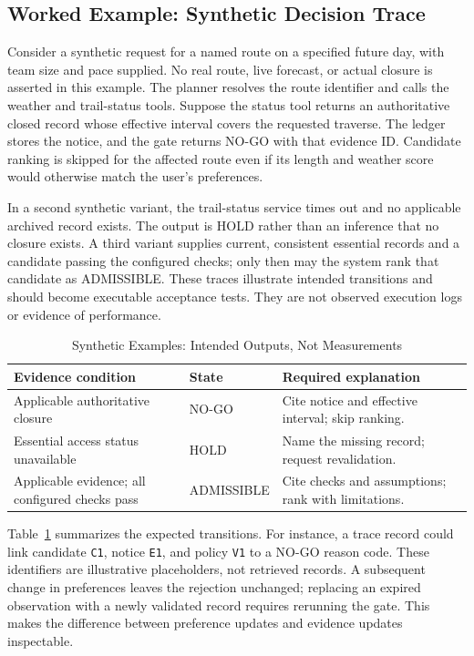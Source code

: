 \documentclass[conference]{IEEEtran}
\begin{document}
\subsection{Worked Example: Synthetic Decision Trace}
Consider a synthetic request for a named route on a specified future day, with team size and pace supplied. No real route, live forecast, or actual closure is asserted in this example. The planner resolves the route identifier and calls the weather and trail-status tools. Suppose the status tool returns an authoritative closed record whose effective interval covers the requested traverse. The ledger stores the notice, and the gate returns NO-GO with that evidence ID. Candidate ranking is skipped for the affected route even if its length and weather score would otherwise match the user's preferences.

In a second synthetic variant, the trail-status service times out and no applicable archived record exists. The output is HOLD rather than an inference that no closure exists. A third variant supplies current, consistent essential records and a candidate passing the configured checks; only then may the system rank that candidate as ADMISSIBLE. These traces illustrate intended transitions and should become executable acceptance tests. They are not observed execution logs or evidence of performance.

\begin{table}[t]
\caption{Synthetic Examples: Intended Outputs, Not Measurements}
\label{tab:synthetic}
\centering\footnotesize
\begin{tabular}{@{}p{}p{}p{}@{}}
\toprule
Evidence condition & State & Required explanation\\
\midrule
Applicable authoritative closure & NO-GO & Cite notice and effective interval; skip ranking.\\
Essential access status unavailable & HOLD & Name the missing record; request revalidation.\\
Applicable evidence; all configured checks pass & ADMISSIBLE & Cite checks and assumptions; rank with limitations.\\
\bottomrule
\end{tabular}
\end{table}

Table~\ref{tab:synthetic} summarizes the expected transitions. For instance, a trace record could link candidate \texttt{C1}, notice \texttt{E1}, and policy \texttt{V1} to a NO-GO reason code. These identifiers are illustrative placeholders, not retrieved records. A subsequent change in preferences leaves the rejection unchanged; replacing an expired observation with a newly validated record requires rerunning the gate. This makes the difference between preference updates and evidence updates inspectable.
\end{document}
